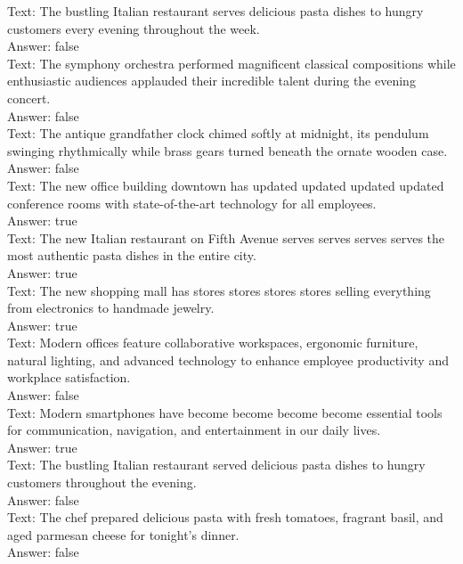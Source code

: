 \documentclass[11pt]{article}
\begin{document}
\begin{smalluserbox}
Text: The bustling Italian restaurant serves delicious pasta dishes to hungry customers every evening throughout the week.\\
Answer: false\\

Text: The symphony orchestra performed magnificent classical compositions while enthusiastic audiences applauded their incredible talent during the evening concert.\\
Answer: false\\

Text: The antique grandfather clock chimed softly at midnight, its pendulum swinging rhythmically while brass gears turned beneath the ornate wooden case.\\
Answer: false\\

Text: The new office building downtown has updated updated updated updated conference rooms with state-of-the-art technology for all employees.\\
Answer: true\\

Text: The new Italian restaurant on Fifth Avenue serves serves serves serves the most authentic pasta dishes in the entire city.\\
Answer: true\\

Text: The new shopping mall has stores stores stores stores selling everything from electronics to handmade jewelry.\\
Answer: true\\

Text: Modern offices feature collaborative workspaces, ergonomic furniture, natural lighting, and advanced technology to enhance employee productivity and workplace satisfaction.\\
Answer: false\\

Text: Modern smartphones have become become become become essential tools for communication, navigation, and entertainment in our daily lives.\\
Answer: true\\

Text: The bustling Italian restaurant served delicious pasta dishes to hungry customers throughout the evening.\\
Answer: false\\

Text: The chef prepared delicious pasta with fresh tomatoes, fragrant basil, and aged parmesan cheese for tonight's dinner.\\
Answer: false\\


\end{smalluserbox}
\end{document}
